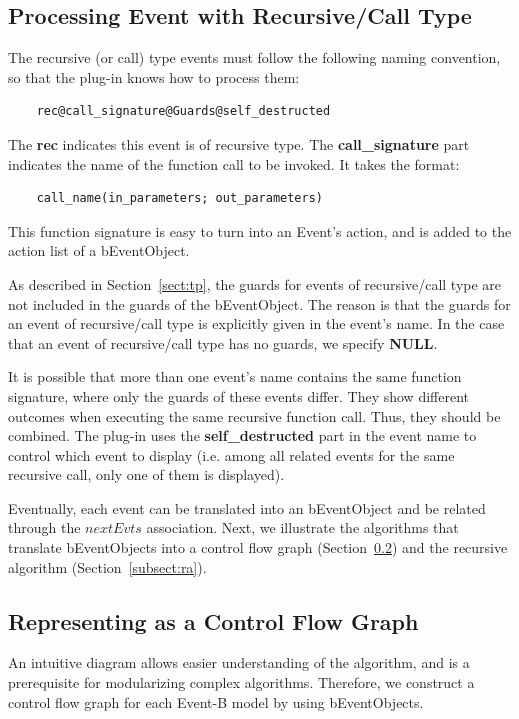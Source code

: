 \documentclass{easychair}
\begin{document}
\subsection{Processing Event with Recursive/Call Type}\label{subsec:issue}
The recursive (or call) type events must follow the following naming convention, so that the plug-in knows how to process them:

\lstset{language=[68]Algol}
\begin{lstlisting}
	rec@call_signature@Guards@self_destructed
\end{lstlisting}

The \textbf{rec} indicates this event is of recursive type. The \textbf{call\_signature} part indicates the name of the function call to be invoked. It takes the format:
\lstset{language=[68]Algol}
\begin{lstlisting}
	call_name(in_parameters; out_parameters)
\end{lstlisting} 
This function signature is easy to turn into an Event's action, and is added to the action list of a bEventObject. 

As described in Section~\ref{sect:tp}, the guards for events of recursive/call type are not included in the guards of the bEventObject. The reason is that the guards for an event of recursive/call type is explicitly given in the event's name. In the case that an event of recursive/call type has no guards, we specify \textbf{NULL}. 

It is possible that more than one event's name contains the same function signature, where only the guards of these events differ. They show different outcomes when executing the same recursive function call. Thus, they should be combined. The plug-in uses the \textbf{self\_destructed} part in the event name to control which event to display (i.e. among all related events for the same recursive call, only one of them is displayed). 

Eventually, each event can be translated into an bEventObject and be related through the $nextEvts$ association. Next, we illustrate the algorithms that translate bEventObjects into a control flow graph (Section~\ref{subsect:vis}) and the recursive algorithm (Section~\ref{subsect:ra}).


\subsection{Representing as a Control Flow Graph} \label{subsect:vis}
An intuitive diagram allows easier understanding of the algorithm, and is a prerequisite for modularizing complex algorithms. Therefore, we construct a control flow graph for each Event-B model by using bEventObjects.
\end{document}
